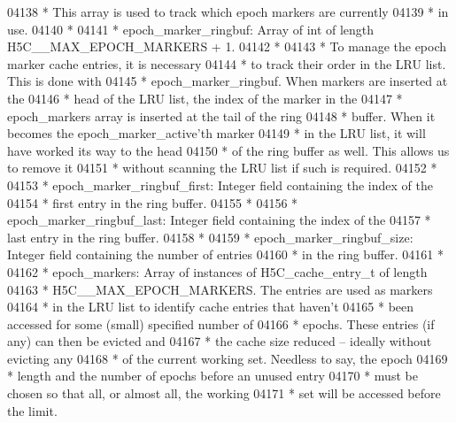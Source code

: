 \begin{DoxyCode}
04138 \textcolor{comment}{ *      This array is used to track which epoch markers are currently}
04139 \textcolor{comment}{ *      in use.}
04140 \textcolor{comment}{ *}
04141 \textcolor{comment}{ * epoch\_marker\_ringbuf:  Array of int of length H5C\_\_MAX\_EPOCH\_MARKERS + 1.}
04142 \textcolor{comment}{ *}
04143 \textcolor{comment}{ *      To manage the epoch marker cache entries, it is necessary}
04144 \textcolor{comment}{ *      to track their order in the LRU list.  This is done with}
04145 \textcolor{comment}{ *      epoch\_marker\_ringbuf.  When markers are inserted at the}
04146 \textcolor{comment}{ *      head of the LRU list, the index of the marker in the}
04147 \textcolor{comment}{ *      epoch\_markers array is inserted at the tail of the ring}
04148 \textcolor{comment}{ *      buffer.  When it becomes the epoch\_marker\_active'th marker}
04149 \textcolor{comment}{ *      in the LRU list, it will have worked its way to the head}
04150 \textcolor{comment}{ *      of the ring buffer as well.  This allows us to remove it}
04151 \textcolor{comment}{ *      without scanning the LRU list if such is required.}
04152 \textcolor{comment}{ *}
04153 \textcolor{comment}{ * epoch\_marker\_ringbuf\_first: Integer field containing the index of the}
04154 \textcolor{comment}{ *      first entry in the ring buffer.}
04155 \textcolor{comment}{ *}
04156 \textcolor{comment}{ * epoch\_marker\_ringbuf\_last: Integer field containing the index of the}
04157 \textcolor{comment}{ *      last entry in the ring buffer.}
04158 \textcolor{comment}{ *}
04159 \textcolor{comment}{ * epoch\_marker\_ringbuf\_size: Integer field containing the number of entries}
04160 \textcolor{comment}{ *      in the ring buffer.}
04161 \textcolor{comment}{ *}
04162 \textcolor{comment}{ * epoch\_markers:  Array of instances of H5C\_cache\_entry\_t of length}
04163 \textcolor{comment}{ *      H5C\_\_MAX\_EPOCH\_MARKERS.  The entries are used as markers}
04164 \textcolor{comment}{ *      in the LRU list to identify cache entries that haven't}
04165 \textcolor{comment}{ *      been accessed for some (small) specified number of}
04166 \textcolor{comment}{ *      epochs.  These entries (if any) can then be evicted and}
04167 \textcolor{comment}{ *      the cache size reduced -- ideally without evicting any}
04168 \textcolor{comment}{ *      of the current working set.  Needless to say, the epoch}
04169 \textcolor{comment}{ *      length and the number of epochs before an unused entry}
04170 \textcolor{comment}{ *      must be chosen so that all, or almost all, the working}
04171 \textcolor{comment}{ *      set will be accessed before the limit.}

\end{DoxyCode}
